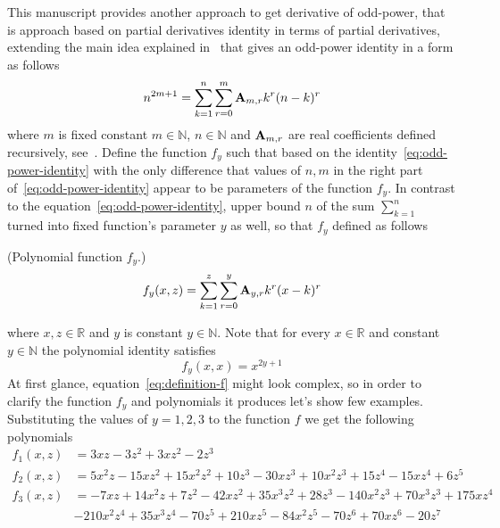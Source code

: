 This manuscript provides another approach to get derivative of odd-power, that is approach based
on partial derivatives identity in terms of partial derivatives, extending the main idea explained in~\cite{kolosov_2022}
that gives an odd-power identity in a form as follows
\begin{equation}
    n^{2m+1} = \sum_{k=1}^{n} \sum_{r=0}^{m} {\mathbf{A}} \sb{m,r} k^r (n-k)^r
    \label{eq:odd-power-identity}
\end{equation}
where $m$ is fixed constant $m\in\mathbb{N}$, $n \in \mathbb{N}$ and ${\mathbf{A}} \sb{m,r}$ are real coefficients defined
recursively, see~\cite{kolosov2016link}.
Define the function $f_{y}$ such that based on the identity~\eqref{eq:odd-power-identity} with the only difference that
values of $n, m$ in the right part of~\eqref{eq:odd-power-identity} appear to be parameters of the function $f_{y}$.
In contrast to the equation~\eqref{eq:odd-power-identity}, upper bound $n$ of the sum $\sum_{k=1}^{n}$ turned into fixed
function's parameter $y$ as well, so that $f_{y}$ defined as follows
\begin{definition} (Polynomial function $f_{y}$.)
    \begin{equation}
        f_{y} (x, z) = \sum_{k=1}^{z} \sum_{r=0}^{y} {\mathbf{A}} \sb{y,r} k^r (x-k)^r
        \label{eq:definition-f}
    \end{equation}
\end{definition}
where $x, z\in \mathbb{R}$ and $y$ is constant $y \in \mathbb{N}$.
Note that for every $x\in\mathbb{R}$ and constant $y\in\mathbb{N}$ the polynomial identity satisfies
\begin{equation*}
    f_{y} (x, x) = x^{2y+1}
\end{equation*}
At first glance, equation~\eqref{eq:definition-f} might look complex, so in order to clarify
the function $f_y$ and polynomials it produces let's show few examples.
Substituting the values of $y=1,2,3$ to the function $f$ we get the following polynomials
\begin{align*}
    f_{1} (x, z) &= 3 x z - 3 z^2 + 3 x z^2 - 2 z^3 \\
    f_{2} (x, z) &= 5 x^2 z - 15 x z^2 + 15 x^2 z^2 + 10 z^3 - 30 x z^3 + 10 x^2 z^3 +
    15 z^4 - 15 x z^4 + 6 z^5 \\
    f_{3} (x, z) &= -7 x z + 14 x^2 z + 7 z^2 - 42 x z^2 + 35 x^3 z^2 + 28 z^3 - 140 x^2 z^3 + 70 x^3 z^3 + 175 x z^4 \\
    &- 210 x^2 z^4 + 35 x^3 z^4 - 70 z^5 + 210 x z^5 - 84 x^2 z^5 - 70 z^6 + 70 x z^6 - 20 z^7
\end{align*}
